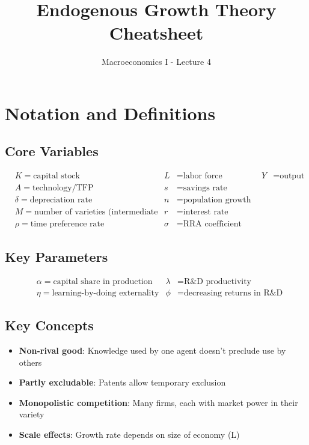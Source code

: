 \documentclass[a4paper,11pt]{article}
\title{\textbf{Endogenous Growth Theory Cheatsheet}}
\author{Macroeconomics I - Lecture 4}
\date{}
\begin{document}
\maketitle

\tableofcontents

\clearpage
\pagestyle{plain}

\section{Notation and Definitions}

\subsection*{Core Variables}
\begin{align*}
& K = \text{capital stock} & L &= \text{labor force} & Y &= \text{output} \\
& A = \text{technology/TFP} & s &= \text{savings rate} \\
& \delta = \text{depreciation rate} & n &= \text{population growth rate} \\
& M = \text{number of varieties (intermediate goods)} & r &= \text{interest rate} \\
& \rho = \text{time preference rate} & \sigma &= \text{RRA coefficient}
\end{align*}

\medskip
\subsection*{Key Parameters}
\begin{align*}
& \alpha = \text{capital share in production} & \lambda &= \text{R\&D productivity} \\
& \eta = \text{learning-by-doing externality} & \phi &= \text{decreasing returns in R\&D}
\end{align*}

\medskip
\subsection*{Key Concepts}
\begin{itemize}
    \item \textbf{Non-rival good}: Knowledge used by one agent doesn't preclude use by others
    \item \textbf{Partly excludable}: Patents allow temporary exclusion
    \item \textbf{Monopolistic competition}: Many firms, each with market power in their variety
    \item \textbf{Scale effects}: Growth rate depends on size of economy (L)
\end{itemize}
\end{document}
